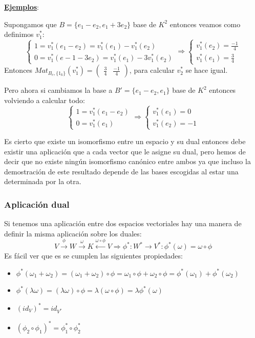\documentclass[10pt,a4paper,openright]{book}
\begin{document}
\underline{\textbf{Ejemplos}}:

Supongamos que $B=\{e_1-e_2, e_1+3e_2\}$ base de $K^2$ entonces veamos como definimos $v_1^*$:
$$\begin{cases}1=v_1^*(e_1-e_2)=v_1^*(e_1)-v_1^*(e_2)\\ 0=v_1^*(e-1-3e_2)= v_1^*(e_1)-3v_1^*(e_2)\end{cases}\Rightarrow \begin{cases}v_1^*(e_2)=\frac{-1}{4} \\ v_1^*(e_1)=\frac{3}{4}\end{cases}$$
Entonces $Mat_{B_c, \{1_k\}}(v_1^*)=\begin{pmatrix} \frac{3}{4} & \frac{-1}{4}\end{pmatrix}$, para calcular $v_2^*$ se hace igual.

Pero ahora si cambiamos la base a $B'=\{e_1-e_2, e_1\}$ base de $K^2$ entonces volviendo a calcular todo:
$$\begin{cases}1= v_1^*(e_1-e_2) \\0=v_1^*(e_1) \end{cases}\Rightarrow \begin{cases}v_1^*(e_1)=0 \\ v_1^*(e_2)=-1\end{cases}$$

Es cierto que existe un isomorfismo entre un espacio y su dual entonces debe existir una aplicación que a cada vector que le asigne su dual, pero hemos de decir que no existe ningún isomorfismo canónico entre ambos ya que incluso la demostración de este resultado depende de las bases escogidas al estar una  determinada por la otra.

\subsubsection*{Aplicación dual}
Si tenemos una aplicación entre dos espacios vectoriales hay una manera de definir la misma aplicación sobre los duales:
$$V\xrightarrow{\phi} W\xrightarrow{\omega} K\stackrel{\omega \circ \phi}{\leftarrow} V\Rightarrow \phi^*: W^*\rightarrow V^*: \phi^*(\omega)=\omega\circ \phi$$
Es fácil ver que es se cumplen las siguientes propiedades:
\begin{itemize}
\item $\phi^*(\omega_1+\omega_2)=(\omega_1+\omega_2)\circ \phi= \omega_1\circ \phi+\omega_2 \circ \phi= \phi^*(\omega_1)+\phi^*(\omega_2)$
\item $\phi^*(\lambda\omega)=(\lambda\omega)\circ \phi=\lambda(\omega\circ\phi)=\lambda \phi^*(\omega)$
\item $(id_V)^*=id_{V^*}$
\item $(\phi_2\circ\phi_1)^*=\phi_1^*\circ \phi_2^*$
\end{itemize}
\end{document}
